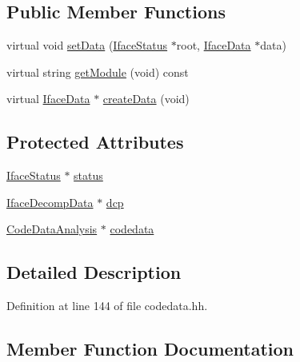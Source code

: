 \subsection*{Public Member Functions}
\begin{DoxyCompactItemize}
\item 
virtual void \mbox{\hyperlink{class_iface_code_data_command_a778193a98c1a977a3635e63eb15a26d0}{set\+Data}} (\mbox{\hyperlink{class_iface_status}{Iface\+Status}} $\ast$root, \mbox{\hyperlink{class_iface_data}{Iface\+Data}} $\ast$data)
\item 
virtual string \mbox{\hyperlink{class_iface_code_data_command_abfa633dd19e5672b125425a9541c94d3}{get\+Module}} (void) const
\item 
virtual \mbox{\hyperlink{class_iface_data}{Iface\+Data}} $\ast$ \mbox{\hyperlink{class_iface_code_data_command_a1ab8f8101f822cb726bca9e326fd5980}{create\+Data}} (void)
\end{DoxyCompactItemize}
\subsection*{Protected Attributes}
\begin{DoxyCompactItemize}
\item 
\mbox{\hyperlink{class_iface_status}{Iface\+Status}} $\ast$ \mbox{\hyperlink{class_iface_code_data_command_a8bc924bbcfedad566608dfda1ff4432c}{status}}
\item 
\mbox{\hyperlink{class_iface_decomp_data}{Iface\+Decomp\+Data}} $\ast$ \mbox{\hyperlink{class_iface_code_data_command_a81a5f766c3d62c3979a32b5ebb25360b}{dcp}}
\item 
\mbox{\hyperlink{class_code_data_analysis}{Code\+Data\+Analysis}} $\ast$ \mbox{\hyperlink{class_iface_code_data_command_a9b39ac61629b38576d8aabb5b17fdd4f}{codedata}}
\end{DoxyCompactItemize}


\subsection{Detailed Description}


Definition at line 144 of file codedata.\+hh.



\subsection{Member Function Documentation}
\mbox{\label{class_iface_code_data_command_a1ab8f8101f822cb726bca9e326fd5980}} 
